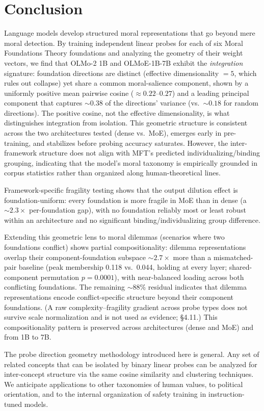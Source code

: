 \section{Conclusion}\label{conclusion}

Language models develop structured moral representations that go
beyond mere moral detection. By training independent linear probes
for each of six Moral Foundations Theory foundations and analyzing
the geometry of their weight vectors, we find that OLMo-2 1B and
OLMoE-1B-7B exhibit the \emph{integration} signature: foundation
directions are distinct (effective dimensionality \(= 5\), which rules
out collapse) yet share a common moral-salience component, shown by a
uniformly positive mean pairwise cosine (\(\approx 0.22\)--\(0.27\)) and a
leading principal component that captures \({\sim}0.38\) of the
directions' variance (vs.~\({\sim}0.18\) for random directions). The
positive cosine, not the effective dimensionality, is what
distinguishes integration from isolation. This
geometric structure is consistent across the two architectures
tested (dense vs.~MoE), emerges early in pre-training, and
stabilizes before probing accuracy saturates. However, the
inter-framework structure does not align with MFT's predicted
individualizing/binding grouping, indicating that the model's
moral taxonomy is empirically grounded in corpus statistics rather
than organized along human-theoretical lines.

Framework-specific fragility testing shows that the output dilution
effect is foundation-uniform: every foundation is more fragile in MoE
than in dense (a \({\sim}2.3\times\) per-foundation gap), with no
foundation reliably most or least robust within an architecture and no
significant binding/individualizing group difference.

Extending this geometric lens to moral dilemmas (scenarios
where two foundations conflict) shows partial compositionality:
dilemma representations overlap their component-foundation subspace
\({\sim}2.7\times\) more than a mismatched-pair baseline (peak
membership 0.118 vs.~0.044, holding at every layer; shared-component
permutation \(p = 0.0001\)), with near-balanced loading across both
conflicting foundations. The remaining \({\sim}88\)\% residual indicates
that dilemma representations encode conflict-specific structure beyond
their component foundations. (A raw complexity--fragility gradient
across probe types does not survive scale normalization and is not used
as evidence; \S4.11.) This compositionality pattern is preserved across
architectures (dense and MoE) and from 1B to 7B.

The probe direction geometry methodology introduced here is
general. Any set of related concepts that can be isolated by
binary linear probes can be analyzed for inter-concept structure
via the same cosine similarity and clustering techniques. We
anticipate applications to other taxonomies of human values, to
political orientation, and to the internal organization of safety
training in instruction-tuned models.
